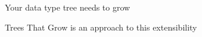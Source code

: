 \begin{frame}
\begin{center}
Your data type tree needs to grow
\end{center}
\end{frame}

\begin{frame}
\begin{center}
Trees That Grow is an approach to this extensibility
\end{center}
\end{frame}
